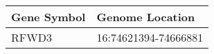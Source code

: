 \begin{tabular}{ll}
\toprule
Gene Symbol &      Genome Location \\
\midrule
      RFWD3 & 16:74621394-74666881 \\
\bottomrule
\end{tabular}
